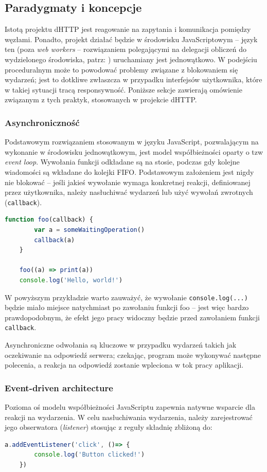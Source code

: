 \subsection{Paradygmaty i koncepcje}
Istotą projektu dHTTP jest reagowanie na zapytania i komunikacja pomiędzy węzłami. Ponadto, projekt działać będzie w środowisku JavaScriptowym -- język ten (poza {\em web workers} -- rozwiązaniem polegającymi na delegacji obliczeń do wydzielonego środowiska, patrz: \cite{webWorkers}) uruchamiany jest jednowątkowo. W podejściu proceduralnym może to powodować problemy związane z blokowaniem się wydarzeń; jest to dotkliwe zwłaszcza w przypadku interfejsów użytkownika, które w takiej sytuacji tracą responsywność. Poniższe sekcje zawierają omówienie związanym z tych praktyk, stosowanych w projekcie dHTTP.


\subsubsection{Asynchroniczność}
Podstawowym rozwiązaniem stosowanym w języku JavaScript, pozwalającym na wykonanie w środowisku jednowątkowym, jest model współbieżności oparty o tzw {\em event loop}. Wywołania funkcji odkładane są na stosie, podczas gdy kolejne wiadomości są wkładane do kolejki FIFO. Podstawowym założeniem jest nigdy nie blokować -- jeśli jakieś wywołanie wymaga konkretnej reakcji, definiowanej przez użytkownika, należy nasłuchiwać wydarzeń lub użyć wywołań zwrotnych (\texttt{callback}).

\begin{lstlisting}[language=javascript]
    function foo(callback) {
        var a = someWaitingOperation()
        callback(a)
    }

    foo((a) => print(a))
    console.log('Hello, world!')
\end{lstlisting}

W powyższym przykładzie warto zauważyć, że wywołanie \texttt{console.log(...)} będzie miało miejsce natychmiast po zawołaniu funkcji foo -- jest więc bardzo prawdopodobnym, że efekt jego pracy widoczny będzie przed zawołaniem funkcji \texttt{callback}.

Asynchroniczne odwołania są kluczowe w przypadku wydarzeń takich jak oczekiwanie na odpowiedź serwera; czekając, program może wykonywać następne polecenia, a reakcja na odpowiedź zostanie wpleciona w tok pracy aplikacji.

\subsubsection{Event-driven architecture}
Pozioma oś modelu współbieżności JavaScriptu zapewnia natywne wsparcie dla reakcji na wydarzenia. W celu nasłuchiwania wydarzenia, należy zarejestrować jego obserwatora ({\em listener}) stosując z reguły składnię zbliżoną do:
\begin{lstlisting}[language=javascript]
    a.addEventListener('click', ()=> {
        console.log('Button clicked!')
    })
\end{lstlisting}

